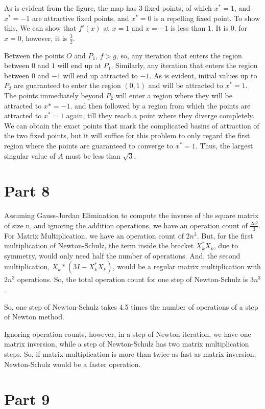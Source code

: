 \documentclass{article}
\begin{document}
As is evident from the figure, the map has 3 fixed points, of which $x^*=1$, and $x^*=-1$ are attractive fixed points, and $x^*=0$ is a repelling fixed point. To show this, We can show that $f'(x)$ at $x=1$ and $x=-1$ is less than $1$. It is $0$. for $x=0$, however, it is $\frac{3}{2}$.

Between the points $O$ and $P_1$, $f > g$, so, any iteration that enters the region between $0$ and $1$ will end up at $P_1$. Similarly, any iteration that enters the region between $0$ and $-1$ will end up attracted to $-1$. As is evident, initial values up to $P_2$ are guaranteed to enter the region $(0, 1)$ and will be attracted to $x^*=1$. The points immediately beyond $P_2$ will enter a region where they will be attracted to $x*=-1$. and then followed by a region from which the points are attracted to $x^*=1$ again, till they reach a point where they diverge completely. We can obtain the exact points that mark the complicated basins of attraction of the two fixed points, but it will suffice for this problem to only regard the first region where the points are guaranteed to converge to $x^*=1$. Thus, the largest singular value of $A$ must be less than $\sqrt{3}$. 

\newpage
\section{Part 8}

Assuming Gauss-Jordan Elimination to compute the inverse of the square matrix of size n, and ignoring the addition operations, we have an operation count of $\frac{2n^3}{3}$. For Matrix Multiplication, we have an operation count of $2n^3$. But, for the first multiplication of Newton-Schulz, the term inside the bracket $X_k^* X_k$, due to symmetry, would only need half the number of operations. And, the second multiplication, $X_k * (3I - X_k^* X_k)$, would be a regular matrix multiplication with $2n^3$ operations. So, the total operation count for one step of Newton-Schulz is $3n^3$. 

So, one step of Newton-Schulz takes 4.5 times the number of operations of a step of Newton method.

Ignoring operation counts, however, in a step of Newton iteration, we have one matrix inversion, while a step of Newton-Schulz has two matrix multiplication steps. So, if matrix multiplication is more than twice as fast as matrix inversion, Newton-Schulz would be a faster operation.

\section{Part 9}
\end{document}
